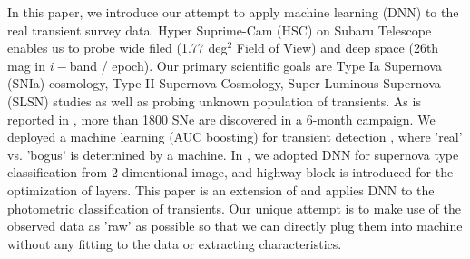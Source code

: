 \documentclass[useamsfonts]{pasj01}
\begin{document}
In this paper, we introduce our attempt to apply machine learning (DNN) to the real transient survey data.
Hyper Suprime-Cam (HSC) on Subaru Telescope enables us to probe wide filed (1.77 deg$^2$ Field of View) and deep space (26th mag in $i-$band / epoch).  Our primary scientific goals are Type Ia Supernova (SNIa) cosmology, Type II Supernova Cosmology, Super Luminous Supernova (SLSN) studies as well as probing unknown population of transients.  
As is reported in \citet{yasuda19a}, more than 1800 SNe are discovered in a 6-month campaign. 
We deployed a machine learning (AUC boosting) for transient detection \citep{morii16a}, where 'real' vs. 'bogus' is determined by a machine.
In \citet{kimura17a}, we adopted DNN for supernova type classification from 2 dimentional image, and highway block is introduced for the optimization of layers.
This paper is an extension of \citet{kimura17a} and applies DNN to the photometric classification of transients.   
Our unique attempt is to make use of the observed data as 'raw' as possible so that we can directly plug them into machine without any fitting to the data or extracting characteristics.
 
%
\end{document}
